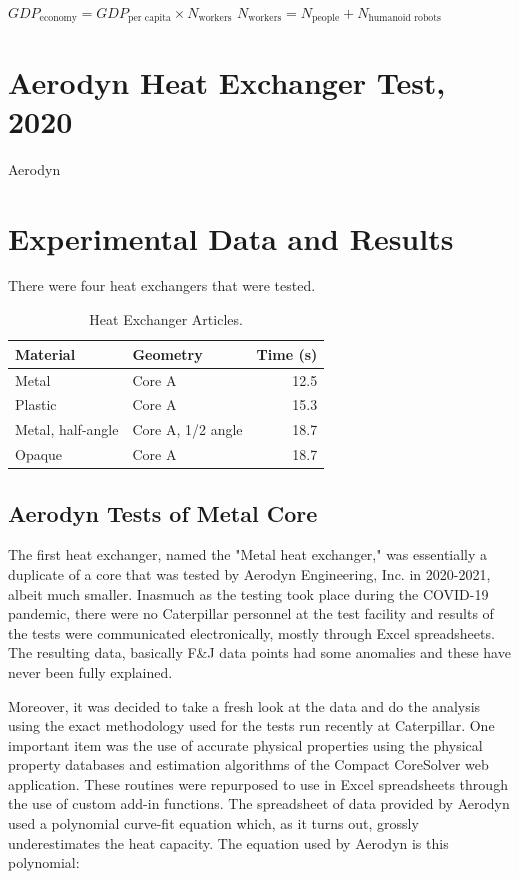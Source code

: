 \documentclass[12pt]{article}
\begin{document}
$ GDP_{\text{economy}} = GDP_{\text{per\ capita}} \times N_{\text{workers}} $
\newline
\newline
$ N_{\text{workers}} =  N_{\text{people}} + N_{\text{humanoid\ robots}} $


\section{Aerodyn Heat Exchanger Test, 2020}
Aerodyn 

\section{Experimental Data and Results}
There were four heat exchangers that were tested. 

\begin{table}[h]
	\centering
	\caption{Heat Exchanger Articles.}
\label{tab:results}
\begin{tabular}{|l|l|r|}
	\hline
	\textbf{Material} & \textbf{Geometry} & \textbf{Time (s)} \\
	\hline
	Metal & Core A & 12.5 \\
	Plastic & Core A & 15.3 \\
	Metal, half-angle & Core A, 1/2 angle & 18.7 \\
	Opaque & Core A & 18.7 \\
	\hline
\end{tabular}
\end{table}

\subsection{Aerodyn Tests of Metal Core}
The first heat exchanger, named the "Metal heat exchanger," was essentially a duplicate of a core that was tested by Aerodyn Engineering, Inc. in 2020-2021, albeit much smaller. Inasmuch as the testing took place during the COVID-19 pandemic, there were no Caterpillar personnel at the test facility and results of the tests were communicated electronically, mostly through Excel spreadsheets. The resulting data, basically F\&J data points had some anomalies and these have never been fully explained.

Moreover, it was decided to take a fresh look at the data and do the analysis using the exact methodology used for the tests run recently at Caterpillar. One important item was the use of accurate physical properties using the physical property databases and estimation algorithms of the Compact CoreSolver web application. These routines were repurposed to use in Excel spreadsheets through the use of custom add-in functions. The spreadsheet of data provided by Aerodyn used a polynomial curve-fit equation which, as it turns out, grossly underestimates the heat capacity. The equation used by Aerodyn is this polynomial:
\end{document}
